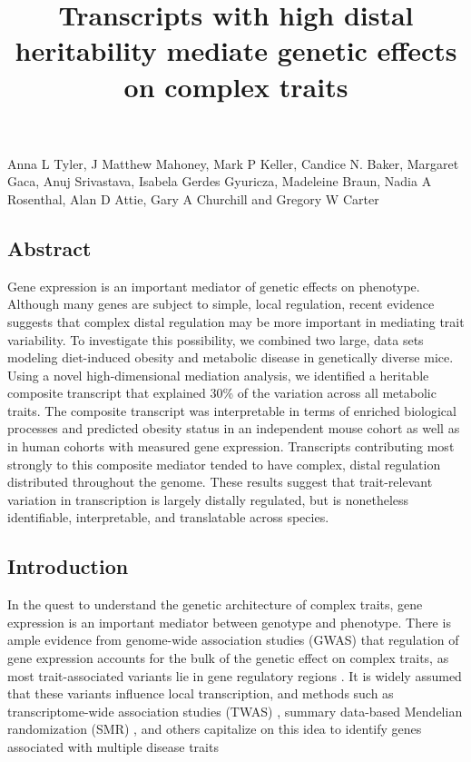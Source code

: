 \documentclass[
]{article}
\title{Transcripts with high distal heritability mediate genetic effects
on complex traits}
\author{}
\date{\vspace{-2.5em}}
\begin{document}
\maketitle

Anna L Tyler, J Matthew Mahoney, Mark P Keller, Candice N. Baker,
Margaret Gaca, Anuj Srivastava, Isabela Gerdes Gyuricza, Madeleine
Braun, Nadia A Rosenthal, Alan D Attie, Gary A Churchill and Gregory W
Carter

\subsection{Abstract}\label{abstract}

Gene expression is an important mediator of genetic effects on
phenotype. Although many genes are subject to simple, local regulation,
recent evidence suggests that complex distal regulation may be more
important in mediating trait variability. To investigate this
possibility, we combined two large, data sets modeling diet-induced
obesity and metabolic disease in genetically diverse mice. Using a novel
high-dimensional mediation analysis, we identified a heritable composite
transcript that explained 30\% of the variation across all metabolic
traits. The composite transcript was interpretable in terms of enriched
biological processes and predicted obesity status in an independent
mouse cohort as well as in human cohorts with measured gene expression.
Transcripts contributing most strongly to this composite mediator tended
to have complex, distal regulation distributed throughout the genome.
These results suggest that trait-relevant variation in transcription is
largely distally regulated, but is nonetheless identifiable,
interpretable, and translatable across species.

\subsection{Introduction}\label{introduction}

In the quest to understand the genetic architecture of complex traits,
gene expression is an important mediator between genotype and phenotype.
There is ample evidence from genome-wide association studies (GWAS) that
regulation of gene expression accounts for the bulk of the genetic
effect on complex traits, as most trait-associated variants lie in gene
regulatory regions \cite{pmid22955828, 
pmid25363779, pmid21617055, pmid19474294, pmid24702953, 
pmid24316577, pmid27126046}. It is widely assumed that these variants
influence local transcription, and methods such as transcriptome-wide
association studies (TWAS)
\cite{pmid33020666, pmid26258848, pmid27019110, pmid26854917}, summary
data-based Mendelian randomization (SMR) \cite{pmid27019110}, and others
capitalize on this idea to identify genes associated with multiple
disease traits \cite{pmid29567659, pmid35533209, pmid27309819, 
pmid30950127}
\end{document}
